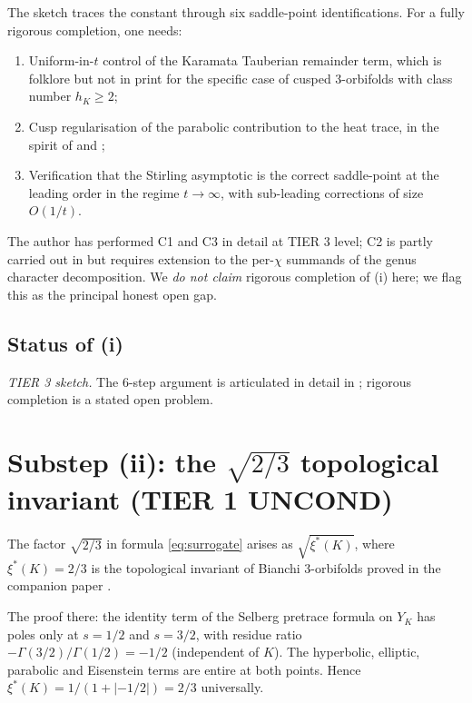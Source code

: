 \documentclass[11pt,a4paper,reqno]{amsart}
\theoremstyle{definition}
\newcommand{\YK}{Y_K}
\begin{document}
The sketch \cite[\S 4--5]{Remondiere2026Selberg} traces the constant through six saddle-point identifications. For a fully rigorous completion, one needs:
\begin{enumerate}[label=\textbf{C\arabic*.}, leftmargin=2em]
   \item Uniform-in-$t$ control of the Karamata Tauberian remainder term, which is folklore but not in print for the specific case of cusped 3-orbifolds with class number $h_K\ge 2$;
   \item Cusp regularisation of the parabolic contribution to the heat trace, in the spirit of \cite[\S 6.4]{ElstrodtGrunewaldMennicke1998} and \cite{Sarnak1983};
   \item Verification that the Stirling asymptotic is the correct saddle-point at the leading order in the regime $t\to\infty$, with sub-leading corrections of size $O(1/t)$.
\end{enumerate}
The author has performed C1 and C3 in detail at TIER 3 level; C2 is partly carried out in \cite[\S 6.4 Lem.~6.5]{ElstrodtGrunewaldMennicke1998} but requires extension to the per-$\chi$ summands of the genus character decomposition. We \emph{do not claim} rigorous completion of (i) here; we flag this as the principal honest open gap.

\subsection{Status of (i)}\label{ss:status-i}

\emph{TIER 3 sketch.} The 6-step argument is articulated in detail in
\cite[\S 4--5]{Remondiere2026Selberg}; rigorous completion is a stated open
problem.

\section{Substep (ii): the $\sqrt{2/3}$ topological invariant (TIER 1 UNCOND)}\label{sec:two-thirds}

The factor $\sqrt{2/3}$ in formula \eqref{eq:surrogate} arises as
$\sqrt{\xi^*(K)}$, where $\xi^*(K) = 2/3$ is the topological invariant of
Bianchi 3-orbifolds proved in the companion paper \cite{Remondiere2026CR}.

The proof there: the identity term of the Selberg pretrace formula on $\YK$
has poles only at $s=1/2$ and $s=3/2$, with residue ratio $-\Gamma(3/2)/\Gamma(1/2) = -1/2$ (independent of $K$). The hyperbolic, elliptic, parabolic and Eisenstein terms are entire at both points. Hence
$\xi^*(K) = 1/(1+|{-1/2}|) = 2/3$ universally.
\end{document}

